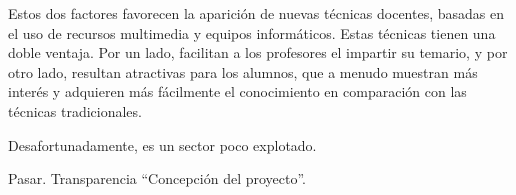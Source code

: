 \documentclass[landscape]{article}
\newenvironment{nota}
{%
\begin{framed} \noindent\itshape
}
{%
\end{framed}\vspace{-0.5cm} }
\begin{document}
\begin{multicols*}{2}
Estos dos factores favorecen la aparición de nuevas técnicas docentes, basadas
en el uso de recursos multimedia y equipos informáticos. Estas técnicas tienen
una doble ventaja. Por un lado, facilitan a los profesores el impartir su
temario, y por otro lado, resultan atractivas para los alumnos, que a menudo
muestran más interés y adquieren más fácilmente el conocimiento en comparación
con las técnicas tradicionales.

Desafortunadamente, es un sector poco explotado.

\begin{nota}
  Pasar. Transparencia ``Concepción del proyecto''.
\end{nota}


\vfill
\pagebreak


\end{multicols*}
\end{document}
